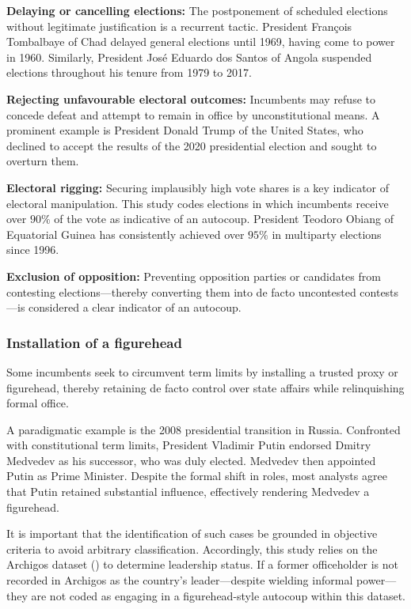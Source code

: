 \documentclass[
  12pt,
]{report}
\begin{document}
\textbf{Delaying or cancelling elections:} The postponement of scheduled
elections without legitimate justification is a recurrent tactic.
President François Tombalbaye of Chad delayed general elections until
1969, having come to power in 1960. Similarly, President José Eduardo
dos Santos of Angola suspended elections throughout his tenure from 1979
to 2017.

\textbf{Rejecting unfavourable electoral outcomes:} Incumbents may
refuse to concede defeat and attempt to remain in office by
unconstitutional means. A prominent example is President Donald Trump of
the United States, who declined to accept the results of the 2020
presidential election and sought to overturn them.

\textbf{Electoral rigging:} Securing implausibly high vote shares is a
key indicator of electoral manipulation. This study codes elections in
which incumbents receive over \(90\%\) of the vote as indicative of an
autocoup. President Teodoro Obiang of Equatorial Guinea has consistently
achieved over \(95\%\) in multiparty elections since 1996.

\textbf{Exclusion of opposition:} Preventing opposition parties or
candidates from contesting elections---thereby converting them into de
facto uncontested contests---is considered a clear indicator of an
autocoup.

\subsubsection*{Installation of a
figurehead}\label{installation-of-a-figurehead}

Some incumbents seek to circumvent term limits by installing a trusted
proxy or figurehead, thereby retaining de facto control over state
affairs while relinquishing formal office.

A paradigmatic example is the 2008 presidential transition in Russia.
Confronted with constitutional term limits, President Vladimir Putin
endorsed Dmitry Medvedev as his successor, who was duly elected.
Medvedev then appointed Putin as Prime Minister. Despite the formal
shift in roles, most analysts agree that Putin retained substantial
influence, effectively rendering Medvedev a figurehead.

It is important that the identification of such cases be grounded in
objective criteria to avoid arbitrary classification. Accordingly, this
study relies on the Archigos dataset
() to
determine leadership status. If a former officeholder is not recorded in
Archigos as the country's leader---despite wielding informal
power---they are not coded as engaging in a figurehead-style autocoup
within this dataset.
\end{document}
